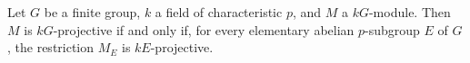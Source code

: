 \begin{corollary}[Chouinard]
\label{cor:chouinard}
Let $G$ be a finite group, $k$ a field of characteristic $p$, and $M$ a $kG$-module. Then $M$ is $kG$-projective if and only if, for every elementary abelian $p$-subgroup $E$ of $G$, the restriction $M_E$ is $kE$-projective.
\end{corollary}
